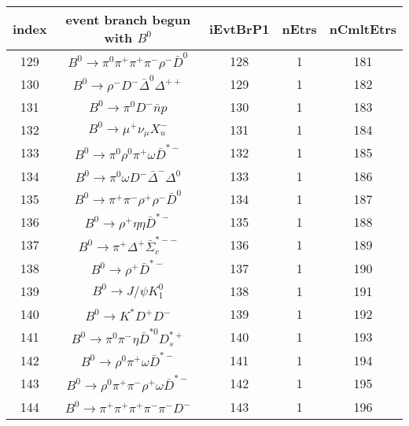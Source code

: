 \documentclass[landscape]{article}
\begin{document}
\begin{table}[htbp!]
\small
\centering
\begin{tabular}{|c|c|c|c|c|}
\hline
index & event branch begun with $ B^{0} $ & iEvtBrP1 & nEtrs & nCmltEtrs \\
\hline
129 & $ B^{0} \rightarrow \pi^{0} \pi^{+} \pi^{+} \pi^{-} \rho^{-} \bar{D}^{0} $ & 128 & 1 & 181 \\
\hline
130 & $ B^{0} \rightarrow \rho^{-} D^{-} \bar{\Delta}^{0} \Delta^{++} $ & 129 & 1 & 182 \\
\hline
131 & $ B^{0} \rightarrow \pi^{0} D^{-} \bar{n} p $ & 130 & 1 & 183 \\
\hline
132 & $ B^{0} \rightarrow \mu^{+} \nu_{\mu} X_{u}^{-} $ & 131 & 1 & 184 \\
\hline
133 & $ B^{0} \rightarrow \pi^{0} \rho^{0} \pi^{+} \omega \bar{D}^{*-} $ & 132 & 1 & 185 \\
\hline
134 & $ B^{0} \rightarrow \pi^{0} \omega D^{-} \bar{\Delta}^{-} \Delta^{0} $ & 133 & 1 & 186 \\
\hline
135 & $ B^{0} \rightarrow \pi^{+} \pi^{-} \rho^{+} \rho^{-} \bar{D}^{0} $ & 134 & 1 & 187 \\
\hline
136 & $ B^{0} \rightarrow \rho^{+} \eta \eta \bar{D}^{*-} $ & 135 & 1 & 188 \\
\hline
137 & $ B^{0} \rightarrow \pi^{+} \Delta^{+} \bar{\Sigma}_{c}^{*--} $ & 136 & 1 & 189 \\
\hline
138 & $ B^{0} \rightarrow \rho^{+} \bar{D}^{*-} $ & 137 & 1 & 190 \\
\hline
139 & $ B^{0} \rightarrow J/\psi K_1^{0} $ & 138 & 1 & 191 \\
\hline
140 & $ B^{0} \rightarrow K^{*} D^{+} D^{-} $ & 139 & 1 & 192 \\
\hline
141 & $ B^{0} \rightarrow \pi^{0} \pi^{-} \eta \bar{D}^{*0} D_{s}^{*+} $ & 140 & 1 & 193 \\
\hline
142 & $ B^{0} \rightarrow \rho^{0} \pi^{+} \omega \bar{D}^{*-} $ & 141 & 1 & 194 \\
\hline
143 & $ B^{0} \rightarrow \rho^{0} \pi^{+} \pi^{-} \rho^{+} \omega \bar{D}^{*-} $ & 142 & 1 & 195 \\
\hline
144 & $ B^{0} \rightarrow \pi^{+} \pi^{+} \pi^{+} \pi^{-} \pi^{-} D^{-} $ & 143 & 1 & 196 \\
\hline
\end{tabular}
\end{table}

\clearpage
\end{document}
